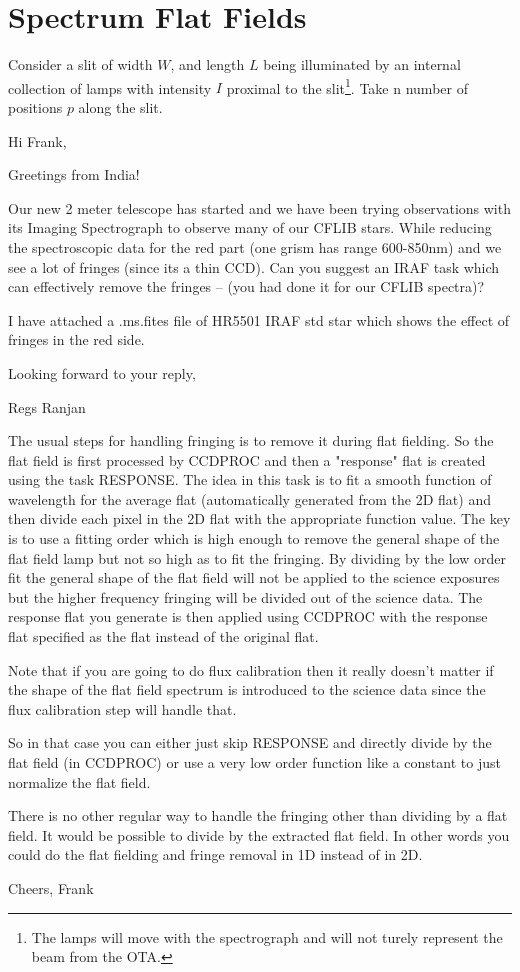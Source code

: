 \section{Spectrum Flat Fields}

Consider a slit of width $W$, and length $L$ being illuminated by an
internal collection of lamps with intensity $I$ proximal to the
slit\footnote{The lamps will move with the spectrograph and will not
  turely represent the beam from the OTA.}. Take n number of positions
$p$ along the slit.


Hi Frank,

Greetings from India! 

Our new 2 meter telescope has started and we have been trying
observations with its Imaging Spectrograph to observe many of our
CFLIB stars. While reducing the spectroscopic data for the red part
(one grism has range 600-850nm) and we see a lot of fringes (since its
a thin CCD). Can you suggest an IRAF task which can effectively remove
the fringes -- (you had done it for our CFLIB spectra)?

I have attached a .ms.fites file of HR5501 IRAF std star which shows
the effect of fringes in the red side.

Looking forward to your reply,

Regs Ranjan


The usual steps for handling fringing is to remove it during flat
fielding.  So the flat field is first processed by CCDPROC and then a
"response" flat is created using the task RESPONSE.  The idea in this
task is to fit a smooth function of wavelength for the average flat
(automatically generated from the 2D flat) and then divide each pixel
in the 2D flat with the appropriate function value.  The key is to use
a fitting order which is high enough to remove the general shape of
the flat field lamp but not so high as to fit the fringing.  By
dividing by the low order fit the general shape of the flat field will
not be applied to the science exposures but the higher frequency
fringing will be divided out of the science data.  The response flat
you generate is then applied using CCDPROC with the response flat
specified as the flat instead of the original flat.

Note that if you are going to do flux calibration then it really
doesn't matter if the shape of the flat field spectrum is introduced
to the science data since the flux calibration step will handle that.

So in that case you can either just skip RESPONSE and directly divide
by the flat field (in CCDPROC) or use a very low order function like a
constant to just normalize the flat field.

There is no other regular way to handle the fringing other than
dividing by a flat field.  It would be possible to divide by the
extracted flat field.  In other words you could do the flat fielding
and fringe removal in 1D instead of in 2D.

Cheers,
Frank
